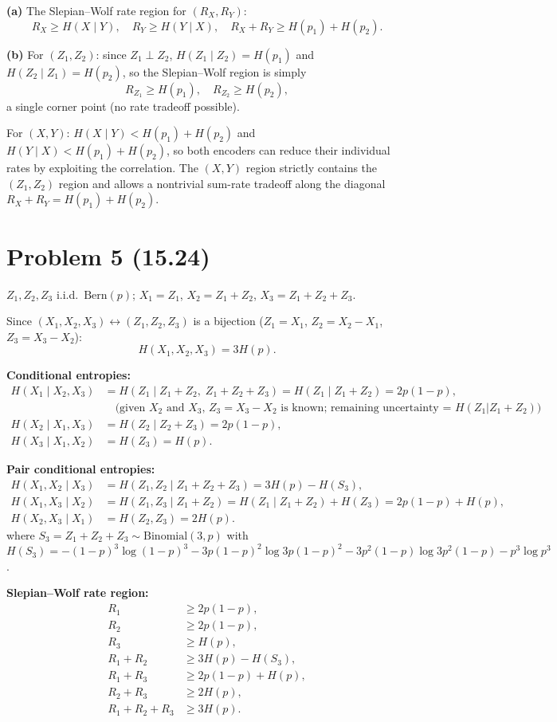 \documentclass[11pt,a4paper]{article}
\begin{document}
\textbf{(a)} The Slepian--Wolf rate region for $(R_X,R_Y)$:
\[
  R_X \ge H(X\mid Y),\quad
  R_Y \ge H(Y\mid X),\quad
  R_X+R_Y \ge H(p_1)+H(p_2).
\]

\textbf{(b)} For $(Z_1,Z_2)$: since $Z_1\perp Z_2$,
$H(Z_1\mid Z_2)=H(p_1)$ and $H(Z_2\mid Z_1)=H(p_2)$, so the Slepian--Wolf region is simply
\[
  R_{Z_1}\ge H(p_1),\quad R_{Z_2}\ge H(p_2),
\]
a single corner point (no rate tradeoff possible).

For $(X,Y)$: $H(X\mid Y)<H(p_1)+H(p_2)$ and $H(Y\mid X)<H(p_1)+H(p_2)$,
so both encoders can reduce their individual rates by exploiting the
correlation.  The $(X,Y)$ region strictly contains the $(Z_1,Z_2)$ region
and allows a nontrivial sum-rate tradeoff along the diagonal $R_X+R_Y=H(p_1)+H(p_2)$.

\section*{Problem 5 \normalfont\small(15.24)}

$Z_1,Z_2,Z_3$ i.i.d.\ $\mathrm{Bern}(p)$;
$X_1=Z_1$, $X_2=Z_1+Z_2$, $X_3=Z_1+Z_2+Z_3$.

Since $(X_1,X_2,X_3)\leftrightarrow(Z_1,Z_2,Z_3)$ is a bijection
($Z_1=X_1$, $Z_2=X_2-X_1$, $Z_3=X_3-X_2$):
\[
  H(X_1,X_2,X_3)=3H(p).
\]

\textbf{Conditional entropies:}
\begin{align*}
H(X_1\mid X_2,X_3) &= H(Z_1\mid Z_1{+}Z_2,\;Z_1{+}Z_2{+}Z_3)
  = H(Z_1\mid Z_1{+}Z_2) = 2p(1-p),\\
  &\quad\text{(given }X_2\text{ and }X_3\text{, }Z_3=X_3-X_2\text{ is known; remaining uncertainty = }H(Z_1|Z_1{+}Z_2))\\[4pt]
H(X_2\mid X_1,X_3) &= H(Z_2\mid Z_2{+}Z_3) = 2p(1-p),\\[4pt]
H(X_3\mid X_1,X_2) &= H(Z_3) = H(p).
\end{align*}

\textbf{Pair conditional entropies:}
\begin{align*}
H(X_1,X_2\mid X_3) &= H(Z_1,Z_2\mid Z_1{+}Z_2{+}Z_3)
  = 3H(p)-H(S_3),\\
H(X_1,X_3\mid X_2) &= H(Z_1,Z_3\mid Z_1{+}Z_2)
  = H(Z_1\mid Z_1{+}Z_2)+H(Z_3) = 2p(1-p)+H(p),\\
H(X_2,X_3\mid X_1) &= H(Z_2,Z_3) = 2H(p).
\end{align*}
where $S_3=Z_1+Z_2+Z_3\sim\mathrm{Binomial}(3,p)$ with
$H(S_3)=-(1-p)^3\log(1-p)^3-3p(1-p)^2\log 3p(1-p)^2
        -3p^2(1-p)\log 3p^2(1-p)-p^3\log p^3$.

\textbf{Slepian--Wolf rate region:}
\[
\begin{aligned}
R_1 &\ge 2p(1-p), \\
R_2 &\ge 2p(1-p), \\
R_3 &\ge H(p), \\
R_1+R_2 &\ge 3H(p)-H(S_3), \\
R_1+R_3 &\ge 2p(1-p)+H(p), \\
R_2+R_3 &\ge 2H(p), \\
R_1+R_2+R_3 &\ge 3H(p).
\end{aligned}
\]
\end{document}
